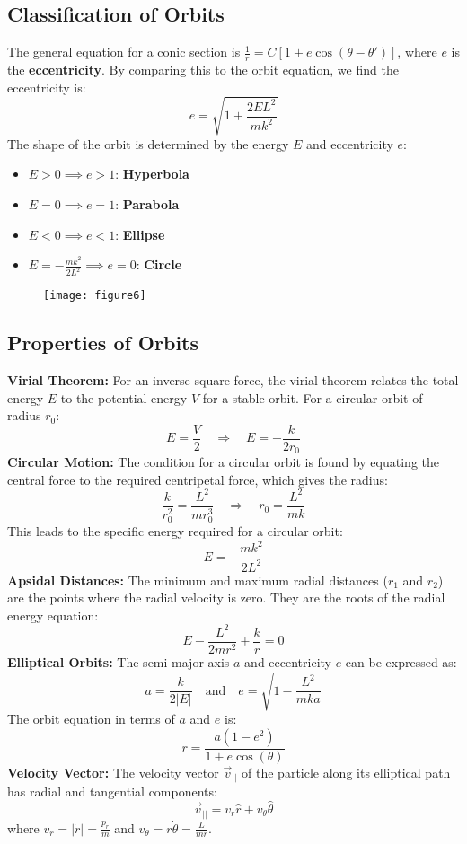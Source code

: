 \documentclass{article}
\begin{document}
	\subsection*{Classification of Orbits}
	The general equation for a conic section is \(\frac{1}{r} = C[1 + e \cos(\theta - \theta')]\), where \(e\) is the \textbf{eccentricity}. By comparing this to the orbit equation, we find the eccentricity is:
	\[
	e = \sqrt{1 + \frac{2EL^2}{mk^2}}
	\]
	The shape of the orbit is determined by the energy \(E\) and eccentricity \(e\):
	\begin{itemize}
		\item \(E > 0 \implies e > 1\): \textbf{Hyperbola}
		\item \(E = 0 \implies e = 1\): \textbf{Parabola}
		\item \(E < 0 \implies e < 1\): \textbf{Ellipse}
		\item \(E = -\frac{mk^2}{2L^2} \implies e = 0\): \textbf{Circle}
	\end{itemize}
	
	\begin{figure}[h]
		\centering
		\texttt{[image: figure6]}
		\caption{}
		\label{fig:figure6}
	\end{figure}
	
	\subsection*{Properties of Orbits}
	
	\textbf{Virial Theorem:} For an inverse-square force, the virial theorem relates the total energy \(E\) to the potential energy \(V\) for a stable orbit. For a circular orbit of radius \(r_0\):
	\[
	E = \frac{V}{2} \quad \Rightarrow \quad E = -\frac{k}{2r_0}
	\]
	\textbf{Circular Motion:} The condition for a circular orbit is found by equating the central force to the required centripetal force, which gives the radius:
	\[
	\frac{k}{r_0^2} = \frac{L^2}{m r_0^3} \quad \Rightarrow \quad r_0 = \frac{L^2}{mk}
	\]
	This leads to the specific energy required for a circular orbit:
	\[
	E = -\frac{mk^2}{2L^2}
	\]
	\textbf{Apsidal Distances:} The minimum and maximum radial distances (\(r_1\) and \(r_2\)) are the points where the radial velocity is zero. They are the roots of the radial energy equation:
	\[
	E - \frac{L^2}{2mr^2} + \frac{k}{r} = 0
	\]
	\textbf{Elliptical Orbits:} The semi-major axis \(a\) and eccentricity \(e\) can be expressed as:
	\[
	a = \frac{k}{2|E|} \quad \text{and} \quad e = \sqrt{1 - \frac{L^2}{mka}}
	\]
	The orbit equation in terms of \(a\) and \(e\) is:
	\[
	r = \frac{a(1-e^2)}{1+e \cos(\theta)}
	\]
	\textbf{Velocity Vector:} The velocity vector \(\vec{v}_{||}\) of the particle along its elliptical path has radial and tangential components:
	\[
	\vec{v}_{||} = v_r \hat{r} + v_{\theta} \hat{\theta}
	\]
	where \(v_r = |\dot{r}| = \frac{p_r}{m}\) and \(v_{\theta} = r\dot{\theta} = \frac{L}{mr}\).
	
\end{document}
